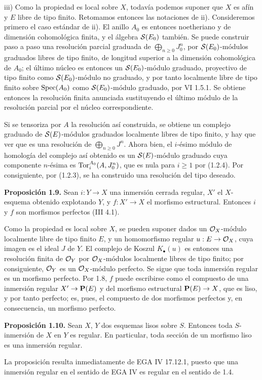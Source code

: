 iii) Como la propiedad es local sobre \(X\), todavía podemos suponer que \(X\) es afín y \(E\) libre de tipo finito. Retomamos entonces las notaciones de ii). Consideremos primero el caso estándar de ii). El anillo \(A_0\) es entonces noetheriano y de dimensión cohomológica finita, y el álgebra \(\mathcal S(E_0)\) también. Se puede construir paso a paso una resolución parcial graduada de \(\bigoplus_{n\ge0}J_0^n\), por \(\mathcal S(E_0)\)-módulos graduados libres de tipo finito, de longitud superior a la dimensión cohomológica de \(A_0\); el último núcleo es entonces un \(\mathcal S(E_0)\)-módulo graduado, proyectivo de tipo finito como \(\mathcal S(E_0)\)-módulo no graduado, y por tanto localmente libre de tipo finito sobre \(\operatorname{Spec}(A_0)\) como \(\mathcal S(E_0)\)-módulo graduado, por VI 1.5.1. Se obtiene entonces la resolución finita anunciada sustituyendo el último módulo de la resolución parcial por el núcleo correspondiente.

Si se tensoriza por \(A\) la resolución así construida, se obtiene un complejo graduado de \(\mathcal S(E)\)-módulos graduados localmente libres de tipo finito, y hay que ver que es una resolución de \(\bigoplus_{n\ge0}J^n\). Ahora bien, el \(i\)-ésimo módulo de homología del complejo así obtenido es un \(\mathcal S(E)\)-módulo graduado cuya componente \(n\)-ésima es \(\operatorname{Tor}_i^{A_0}(A,J_0^n)\), que es nula para \(i\ge1\) por (1.2.4). Por consiguiente, por (1.2.3), se ha construido una resolución del tipo deseado.

\textbf{Proposición 1.9.} Sean \(i:Y\to X\) una inmersión cerrada regular, \(X'\) el \(X\)-esquema obtenido explotando \(Y\), y \(f:X'\to X\) el morfismo estructural. Entonces \(i\) y \(f\) son morfismos perfectos (III 4.1).

Como la propiedad es local sobre \(X\), se pueden suponer dados un \(\mathcal O_X\)-módulo localmente libre de tipo finito \(E\), y un homomorfismo regular \(u:E\to\mathcal O_X\), cuya imagen es el ideal \(J\) de \(Y\). El complejo de Koszul \(K_\bullet(u)\) es entonces una resolución finita de \(\mathcal O_Y\) por \(\mathcal O_X\)-módulos localmente libres de tipo finito; por consiguiente, \(\mathcal O_Y\) es un \(\mathcal O_X\)-módulo perfecto. Se sigue que toda inmersión regular es un morfismo perfecto. Por 1.8, \(f\) puede escribirse como el compuesto de una inmersión regular \(X'\to\mathbf P(E)\) y del morfismo estructural \(\mathbf P(E)\to X\), que es liso, y por tanto perfecto; es, pues, el compuesto de dos morfismos perfectos y, en consecuencia, un morfismo perfecto.

\textbf{Proposición 1.10.} Sean \(X\), \(Y\) dos esquemas lisos sobre \(S\). Entonces toda \(S\)-inmersión de \(X\) en \(Y\) es regular. En particular, toda sección de un morfismo liso es una inmersión regular.

La proposición resulta inmediatamente de EGA IV 17.12.1, puesto que una inmersión regular en el sentido de EGA IV es regular en el sentido de 1.4.
